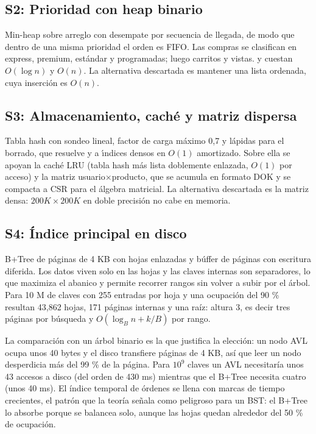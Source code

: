 \documentclass[11pt,letterpaper]{article}
\newcommand{\code}[1]{\texttt{\detokenize{#1}}}
\begin{document}
\subsection{S2: Prioridad con heap binario}
Min-heap sobre arreglo con desempate por secuencia de llegada, de modo que dentro de una misma prioridad el orden es FIFO. Las compras se clasifican en express, premium, est\'andar y programadas; luego carritos y vistas. \code{push} y \code{pop} cuestan $O(\log n)$ y \code{heapify} $O(n)$. La alternativa descartada es mantener una lista ordenada, cuya inserci\'on es $O(n)$.

\subsection{S3: Almacenamiento, cach\'e y matriz dispersa}
Tabla hash con sondeo lineal, factor de carga m\'aximo 0,7 y l\'apidas para el borrado, que resuelve \code{product\_id} y \code{user\_id} a \'\i ndices densos en $O(1)$ amortizado. Sobre ella se apoyan la cach\'e LRU (tabla hash m\'as lista doblemente enlazada, $O(1)$ por acceso) y la matriz usuario$\times$producto, que se acumula en formato DOK y se compacta a CSR para el \'algebra matricial. La alternativa descartada es la matriz densa: $200K\times200K$ en doble precisi\'on no cabe en memoria.

\subsection{S4: \'Indice principal en disco}
B+Tree de p\'aginas de 4 KB con hojas enlazadas y b\'uffer de p\'aginas con escritura diferida. Los datos viven solo en las hojas y las claves internas son separadores, lo que maximiza el abanico y permite recorrer rangos sin volver a subir por el \'arbol. Para 10 M de claves con 255 entradas por hoja y una ocupaci\'on del 90 \% resultan 43,862 hojas, 171 p\'aginas internas y una ra\'iz: altura 3, es decir tres p\'aginas por b\'usqueda y $O(\log_B n + k/B)$ por rango.

La comparaci\'on con un \'arbol binario es la que justifica la elecci\'on: un nodo AVL ocupa unos 40 bytes y el disco transfiere p\'aginas de 4 KB, as\'i que leer un nodo desperdicia m\'as del 99 \% de la p\'agina. Para $10^9$ claves un AVL necesitar\'ia unos 43 accesos a disco (del orden de 430 ms) mientras que el B+Tree necesita cuatro (unos 40 ms). El \'indice temporal de \'ordenes se llena con marcas de tiempo crecientes, el patr\'on que la teor\'ia se\~nala como peligroso para un BST: el B+Tree lo absorbe porque se balancea solo, aunque las hojas quedan alrededor del 50 \% de ocupaci\'on.
\end{document}
